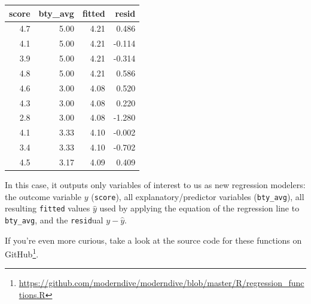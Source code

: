 \documentclass[12pt,]{krantz}
\makeatletter
\newenvironment{Shaded}{\begin{snugshade}}{\end{snugshade}}
\newcommand{\KeywordTok}[1]{\textcolor[rgb]{0.27,0.27,0.27}{\textbf{#1}}}
\newcommand{\DataTypeTok}[1]{\textcolor[rgb]{0.27,0.27,0.27}{#1}}
\newcommand{\DecValTok}[1]{\textcolor[rgb]{0.06,0.06,0.06}{#1}}
\newcommand{\StringTok}[1]{\textcolor[rgb]{0.5,0.5,0.5}{#1}}
\newcommand{\OperatorTok}[1]{\textcolor[rgb]{0.43,0.43,0.43}{\textbf{#1}}}
\newcommand{\NormalTok}[1]{#1}
\renewcommand{\href}[2]{#2\footnote{\url{#1}}}
\newenvironment{kframe}{%
\medskip{}
\setlength{\fboxsep}{.8em}
 \def\at@end@of@kframe{}%
 \ifinner\ifhmode%
  \def\at@end@of@kframe{\end{minipage}}%
  \begin{minipage}{\columnwidth}%
 \fi\fi%
 \def\FrameCommand##1{\hskip\@totalleftmargin \hskip-\fboxsep
 \colorbox{shadecolor}{##1}\hskip-\fboxsep
     \hskip-\linewidth \hskip-\@totalleftmargin \hskip\columnwidth}%
 \MakeFramed {\advance\hsize-\width
   \@totalleftmargin\z@ \linewidth\hsize
   \@setminipage}}%
 {\par\unskip\endMakeFramed%
 \at@end@of@kframe}
\renewenvironment{Shaded}{\begin{kframe}}{\end{kframe}}
\theoremstyle{definition}
\theoremstyle{definition}
\theoremstyle{definition}
\theoremstyle{remark}
\makeatother
\begin{document}
\begin{Shaded}
\end{Shaded}

\begin{table}[H]
\centering\begingroup\fontsize{10}{12}\selectfont

\begin{tabular}{r|r|r|r}
\hline
score & bty\_avg & fitted & resid\\
\hline
4.7 & 5.00 & 4.21 & 0.486\\
\hline
4.1 & 5.00 & 4.21 & -0.114\\
\hline
3.9 & 5.00 & 4.21 & -0.314\\
\hline
4.8 & 5.00 & 4.21 & 0.586\\
\hline
4.6 & 3.00 & 4.08 & 0.520\\
\hline
4.3 & 3.00 & 4.08 & 0.220\\
\hline
2.8 & 3.00 & 4.08 & -1.280\\
\hline
4.1 & 3.33 & 4.10 & -0.002\\
\hline
3.4 & 3.33 & 4.10 & -0.702\\
\hline
4.5 & 3.17 & 4.09 & 0.409\\
\hline
\end{tabular}
\endgroup{}
\end{table}

In this case, it outputs only variables of interest to us as new
regression modelers: the outcome variable \(y\) (\texttt{score}), all
explanatory/predictor variables (\texttt{bty\_avg}), all resulting
\texttt{fitted} values \(\hat{y}\) used by applying the equation of the
regression line to \texttt{bty\_avg}, and the \texttt{resid}ual
\(y - \hat{y}\).

If you're even more curious, take a look at the source code for these
functions on
\href{https://github.com/moderndive/moderndive/blob/master/R/regression_functions.R}{GitHub}.
\end{document}

